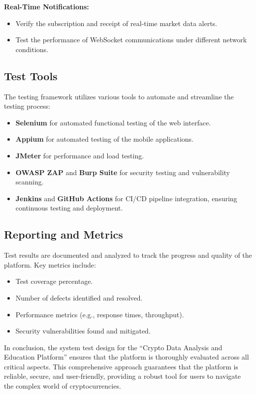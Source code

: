 \documentclass[12pt]{report}
\begin{document}
\textbf{Real-Time Notifications:}
\begin{itemize}
    \item Verify the subscription and receipt of real-time market data alerts.
    \item Test the performance of WebSocket communications under different network conditions.
\end{itemize}

\subsection{Test Tools}

The testing framework utilizes various tools to automate and streamline the testing process:
\begin{itemize}
    \item \textbf{Selenium} for automated functional testing of the web interface.
    \item \textbf{Appium} for automated testing of the mobile applications.
    \item \textbf{JMeter} for performance and load testing.
    \item \textbf{OWASP ZAP} and \textbf{Burp Suite} for security testing and vulnerability scanning.
    \item \textbf{Jenkins} and \textbf{GitHub Actions} for CI/CD pipeline integration, ensuring continuous testing and deployment.
\end{itemize}

\subsection{Reporting and Metrics}

Test results are documented and analyzed to track the progress and quality of the platform. Key metrics include:
\begin{itemize}
    \item Test coverage percentage.
    \item Number of defects identified and resolved.
    \item Performance metrics (e.g., response times, throughput).
    \item Security vulnerabilities found and mitigated.
\end{itemize}

In conclusion, the system test design for the ``Crypto Data Analysis and Education Platform'' ensures that the platform is thoroughly evaluated across all critical aspects. This comprehensive approach guarantees that the platform is reliable, secure, and user-friendly, providing a robust tool for users to navigate the complex world of cryptocurrencies.
\end{document}
